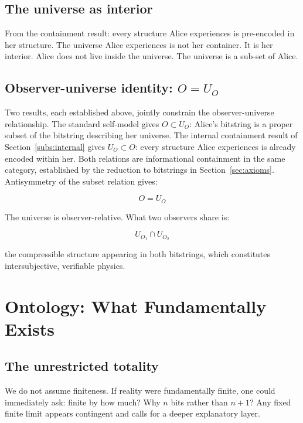 \documentclass[12pt,a4paper]{article}
\begin{document}
\subsection*{The universe as interior}
\label{subs:interior}
From the containment result: every structure Alice experiences is pre-encoded
in her structure. The universe Alice experiences is not her container. It is
her interior. Alice does not live inside the universe. The universe is a sub-set
of Alice.


\subsection*{Observer-universe identity: $O = U_O$}

Two results, each established above, jointly constrain the observer-universe relationship. The standard self-model gives $O \subset U_O$: Alice's bitstring is a proper subset of the bitstring describing her universe. The internal containment result of Section~\ref{subs:internal} gives $U_O \subset O$: every structure Alice experiences is already encoded within her. Both relations are informational containment in the same category, established by the reduction to bitstrings in Section~\ref{sec:axioms}. Antisymmetry of the subset relation gives:

\begin{equation}
\boxed{O = U_O}
\end{equation}

The universe is observer-relative. What two observers share is:

\begin{equation}
U_{O_1} \cap U_{O_2}
\end{equation}

the compressible structure appearing in both bitstrings, which constitutes intersubjective, verifiable physics.



\section{Ontology: What Fundamentally Exists}
\label{sec:ontology}

\subsection*{The unrestricted totality}

We do not assume finiteness. If reality were fundamentally finite, one could
immediately ask: finite by how much? Why $n$ bits rather than $n+1$? Any fixed
finite limit appears contingent and calls for a deeper explanatory layer.
\end{document}
